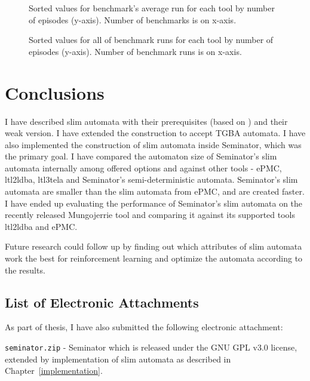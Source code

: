 \documentclass[
	digital,
nolof, nolot
]{fithesis3}
\begin{document}
	\begin{figure}[ht]
		\centering
		
		\caption{Sorted values for benchmark's average run for each tool by number of episodes (y-axis). Number of benchmarks is on x-axis. }
		\label{Cactus:mungoaverage}
		
	\end{figure}
	\begin{figure}
		\centering
		
		\caption{Sorted values for all of benchmark runs for each tool by number of episodes (y-axis). Number of benchmark runs is on x-axis. }
		\label{Cactus:mungoruns}
	
	\end{figure}
	
	\chapter{Conclusions}
	
	I have described slim automata with their prerequisites (based on \cite{hlavni}) and their weak version.
	I have extended the construction to accept TGBA automata.
	I have also implemented the construction of slim automata inside Seminator, which was the primary goal.
	I have compared the automaton size of Seminator's slim automata internally among offered options and against other tools - ePMC, ltl2ldba, ltl3tela and Seminator's semi-deterministic automata. Seminator's slim automata are smaller than the slim automata from ePMC, and are created faster.
	I have ended up evaluating the performance of Seminator's slim automata on the recently released Mungojerrie tool and comparing it against its supported tools ltl2ldba and ePMC. 
	
	Future research could follow up by finding out which attributes of slim automata work the best for reinforcement learning and optimize the automata according to the results.
	
	\begin{appendices}
	
	\chapter{List of Electronic Attachments}
	As part of thesis, I have also submitted the following electronic attachment:
	
	\texttt{seminator.zip} - Seminator which is released under the GNU GPL v3.0 license, extended by implementation of slim automata as described in Chapter~\ref{implementation}.
	\end{appendices}
\end{document}
